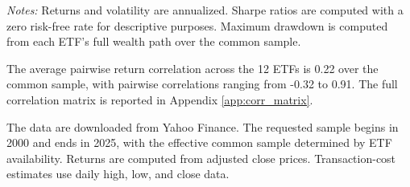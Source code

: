 \documentclass[11pt]{article}
\begin{document}
\begin{table}[h!]
\centering
\scriptsize
\setlength{\tabcolsep}{4pt}
\caption{Descriptive statistics of the ETF universe, April 2007--December 2025}
\label{tab:etf_summary_statistics}
\begin{minipage}{0.92\textwidth}
\footnotesize \emph{Notes:} Returns and volatility are annualized. Sharpe ratios are computed with a zero risk-free rate for descriptive purposes. Maximum drawdown is computed from each ETF's full wealth path over the common sample.
\end{minipage}
\end{table}

The average pairwise return correlation across the 12 ETFs is 0.22 over the common sample, with pairwise correlations ranging from -0.32 to 0.91. The full correlation matrix is reported in Appendix \ref{app:corr_matrix}.

The data are downloaded from Yahoo Finance. The requested sample begins in 2000 and ends in 2025, with the effective common sample determined by ETF availability. Returns are computed from adjusted close prices. Transaction-cost estimates use daily high, low, and close data.
\end{document}
